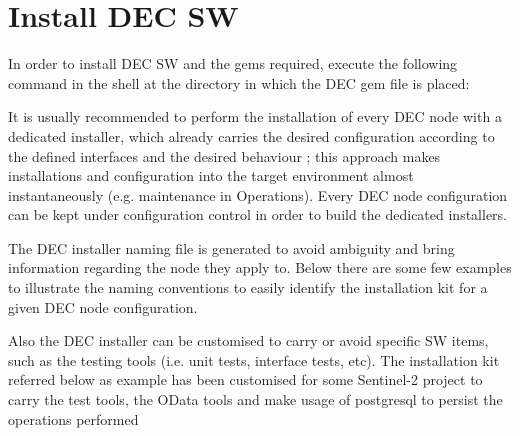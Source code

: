 \documentclass[dec_sum_main.tex]{subfiles}
\begin{document}
\section{Install DEC SW}

In order to install DEC SW and the gems required, execute the following command in the shell at the directory in which the DEC gem file is placed:
\par
{} \newline
\par

\par
\par
\noindent
It is usually recommended to perform the installation of every DEC node with a dedicated installer, which already carries the desired configuration according to the defined interfaces and the desired behaviour ; this approach makes installations and configuration into the target environment almost instantaneously (e.g. maintenance in Operations). Every DEC node configuration can be kept under configuration control in order to build the dedicated installers.\newline

\noindent
The DEC installer naming file is generated to avoid ambiguity and bring information regarding the node they apply to. Below there are some few examples to illustrate the naming conventions to easily identify the installation kit for a given DEC node configuration.\newline
\par

 \newline

 \newline

 \newline

\noindent
Also the DEC installer can be customised to carry or avoid specific SW items, such as the testing tools (i.e. unit tests, interface tests, etc). The installation kit referred below as example has been customised for some Sentinel-2 project to carry the test tools, the OData tools and make usage of postgresql to persist the operations performed \newline
\end{document}
